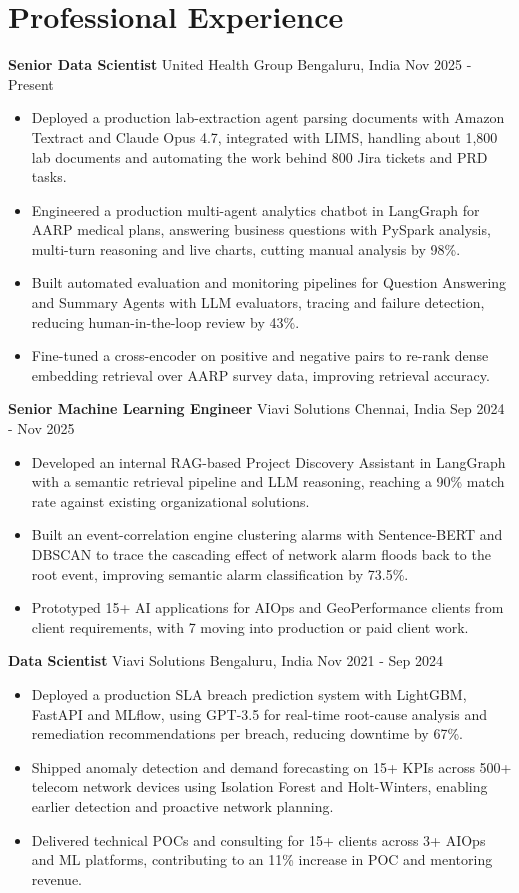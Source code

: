 \documentclass[10pt,a4paper]{article}
\newcommand{\role}[4]{\textbf{#1} \textbar{} #2 \hfill #3 \textbar{} #4\par}
\begin{document}
\section{Professional Experience}
\role{Senior Data Scientist}{United Health Group}{Bengaluru, India}{Nov 2025 - Present}
\begin{itemize}
  \item Deployed a production lab-extraction agent parsing documents with Amazon Textract and Claude Opus 4.7, integrated with LIMS, handling about 1,800 lab documents and automating the work behind 800 Jira tickets and PRD tasks.
  \item Engineered a production multi-agent analytics chatbot in LangGraph for AARP medical plans, answering business questions with PySpark analysis, multi-turn reasoning and live charts, cutting manual analysis by 98\%.
  \item Built automated evaluation and monitoring pipelines for Question Answering and Summary Agents with LLM evaluators, tracing and failure detection, reducing human-in-the-loop review by 43\%.
  \item Fine-tuned a cross-encoder on positive and negative pairs to re-rank dense embedding retrieval over AARP survey data, improving retrieval accuracy.
\end{itemize}
\vspace{3pt}
\role{Senior Machine Learning Engineer}{Viavi Solutions}{Chennai, India}{Sep 2024 - Nov 2025}
\begin{itemize}
  \item Developed an internal RAG-based Project Discovery Assistant in LangGraph with a semantic retrieval pipeline and LLM reasoning, reaching a 90\% match rate against existing organizational solutions.
  \item Built an event-correlation engine clustering alarms with Sentence-BERT and DBSCAN to trace the cascading effect of network alarm floods back to the root event, improving semantic alarm classification by 73.5\%.
  \item Prototyped 15+ AI applications for AIOps and GeoPerformance clients from client requirements, with 7 moving into production or paid client work.
\end{itemize}
\vspace{3pt}
\role{Data Scientist}{Viavi Solutions}{Bengaluru, India}{Nov 2021 - Sep 2024}
\begin{itemize}
  \item Deployed a production SLA breach prediction system with LightGBM, FastAPI and MLflow, using GPT-3.5 for real-time root-cause analysis and remediation recommendations per breach, reducing downtime by 67\%.
  \item Shipped anomaly detection and demand forecasting on 15+ KPIs across 500+ telecom network devices using Isolation Forest and Holt-Winters, enabling earlier detection and proactive network planning.
  \item Delivered technical POCs and consulting for 15+ clients across 3+ AIOps and ML platforms, contributing to an 11\% increase in POC and mentoring revenue.
\end{itemize}
\end{document}
